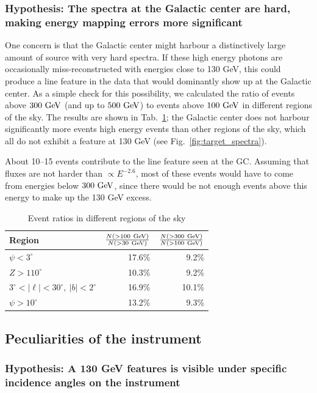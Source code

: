 \documentclass[aps,twocolumn,prd,superscriptaddress,showpacs,nofootinbib,fixfloat]{revtex4}
\newcommand{\GeV}{{\rm ~GeV}}
\begin{document}
\subsubsection{Hypothesis: The spectra at the Galactic center are hard, making
energy mapping errors more significant}

One concern is that the Galactic center might harbour a distinctively large
amount of source with very hard spectra. If these high energy photons are
occasionally miss-reconstructed with energies close to 130 GeV, this could
produce a line feature in the data that would dominantly show up at the
Galactic center. As a simple check for this possibility, we calculated the
ratio of events above $300\GeV$ (and up to $500\GeV$) to events above
$100\GeV$ in different regions of the sky. The results are shown in
Tab.~\ref{tab:eventRatios}; the Galactic center does not harbour significantly
more events high energy events than other regions of the sky, which all do not
exhibit a feature at 130 GeV (see Fig.~\ref{fig:target_spectra}). 

About 10--15 events contribute to the line feature seen at the GC. Assuming
that fluxes are not harder than $\propto E^{-2.6}$, most of these events would
have to come from energies below $300\GeV$, since there would be not enough
events above this energy to make up the 130 GeV excess.

\begin{table}
  \begin{tabular}{lrr}
    \hline
    Region & $\frac{N(>100\GeV)}{N(>30\GeV)}$ & $\frac{N(>300\GeV)}{N(>100\GeV)}$\\
    \hline
    $\psi<3^\circ$ & 17.6\% & 9.2\% \\
    $Z>110^\circ$  & 10.3\% & 9.2\% \\
    $3^\circ < |\ell| < 30^\circ,\ |b|<2^\circ$ & 16.9\% & 10.1\% \\
    $\psi>10^\circ$ & 13.2\% & 9.3\% \\
    \hline
  \end{tabular}
  \caption{Event ratios in different regions of the sky}
  \label{tab:eventRatios}
\end{table}

\subsection{Peculiarities of the instrument}

\subsubsection{Hypothesis: A 130 GeV features is visible under specific
incidence angles on the instrument}
\end{document}

